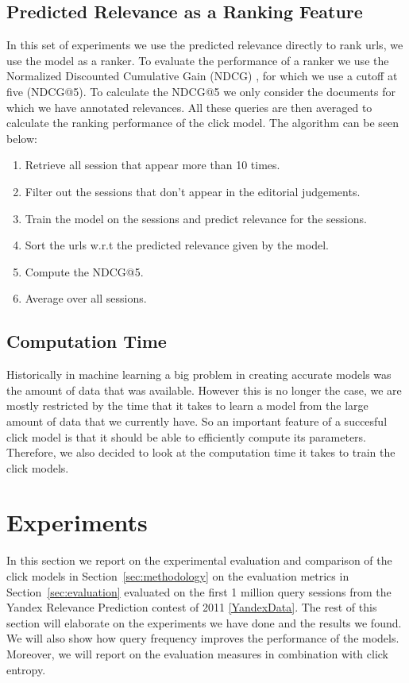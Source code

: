 \subsection{Predicted Relevance as a Ranking Feature}
In this set of experiments we use the predicted relevance directly to rank urls, we use the model as a ranker. To evaluate the performance of a ranker we use the Normalized Discounted Cumulative Gain (NDCG) \cite{NDCG}, for which we use a cutoff at five (NDCG@5). To calculate the NDCG@5 we only consider the documents for which we have annotated relevances. All these queries are then averaged to calculate the ranking performance of the click model. The algorithm can be seen below:

\begin{enumerate}
	\item Retrieve all session that appear more than 10 times.
	\item Filter out the sessions that don't appear in the editorial judgements.
	\item Train the model on the sessions and predict relevance for the sessions.
	\item Sort the urls w.r.t the predicted relevance given by the model.
	\item Compute the NDCG@5.
	\item Average over all sessions.
\end{enumerate}

\subsection{Computation Time}
Historically in machine learning a big problem in creating accurate models was the amount of data that was available. However this is no longer the case, we are mostly restricted by the time that it takes to learn a model from the large amount of data that we currently have. So an important feature of a succesful click model is that it should be able to efficiently compute its parameters. Therefore, we also decided to look at the computation time it takes to train the click models.


\section{Experiments}
In this section we report on the experimental evaluation and comparison of the click models in Section~\ref{sec:methodology} on the evaluation metrics in Section~\ref{sec:evaluation} evaluated on the first 1 million query sessions from the Yandex Relevance Prediction contest of 2011 \ref{YandexData}. The rest of this section will elaborate on the experiments we have done and the results we found. We will also show how query frequency improves the performance of the models. Moreover, we will report on the evaluation measures in combination with click entropy.

